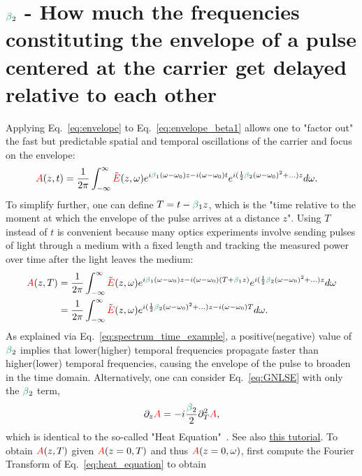 \section{$\betag_2$ - How much the frequencies constituting the envelope of a pulse centered at the carrier get delayed relative to each other}
\label{sec:GVD}
Applying Eq.~\ref{eq:envelope} to Eq.~\ref{eq:envelope_beta1} allows one to "factor out" the fast but predictable spatial and temporal oscillations of the carrier and focus on the envelope:
\begin{align}
    \A(z,t)  &= \frac{1}{2\pi}  \int_{-\infty}^{\infty} \Tilde{\E}(z,\omega) e^{i\betag_1(\omega-\omega_0)z-i(\omega-\omega_0) t} e^{i(\frac{1}{2}\betag_2(\omega-\omega_0)^2+...)z} d\omega.
\end{align}
To simplify further, one can define $T=t-\betag_1z$, which is the "time relative to the moment at which the envelope of the pulse arrives at a distance $z$". Using $T$ instead of $t$ is convenient because many optics experiments involve sending pulses of light through a medium with a fixed length and tracking the measured power over time after the light leaves the medium:   
\begin{align}
    \A(z,T)  &= \frac{1}{2\pi}  \int_{-\infty}^{\infty} \Tilde{\E}(z,\omega) e^{i\betag_1(\omega-\omega_0)z-i(\omega-\omega_0) (T+\betag_1z)} e^{i(\frac{1}{2}\betag_2(\omega-\omega_0)^2+...)z} d\omega \\ \nonumber
    &= \frac{1}{2\pi}  \int_{-\infty}^{\infty} \Tilde{\E}(z,\omega) e^{i(\frac{1}{2}\betag_2(\omega-\omega_0)^2+...)z-i(\omega-\omega_0)T} d\omega.
\end{align} 
As explained via Eq.~\ref{eq:spectrum_time_example}, a positive(negative) value of $\betag_2$ implies that lower(higher) temporal frequencies propagate faster than higher(lower) temporal frequencies, causing the envelope of the pulse to broaden in the time domain. Alternatively, one can consider Eq.~\ref{eq:GNLSE} with only the $\betag_2$ term,
\begin{align}
    \label{eq:heat_equation}
    \partial_z \A = -i  \frac{\betag_2}{2}\partial_T^2\A,
\end{align}
which is identical to the so-called "Heat Equation"~\cite{Fourier_heat_original,Fourier_heat_english}. See also 
\href{https://digitalcommons.ursinus.edu/cgi/viewcontent.cgi?article=1008&context=triumphs_differ}{this tutorial}. To obtain $\textcolor{red}{A}(z,T)$ given $\textcolor{red}{A}(z=0,T)$ and thus $\textcolor{red}{A}(z=0,\omega)$, first compute the Fourier Transform of Eq.~\ref{eq:heat_equation} to obtain
